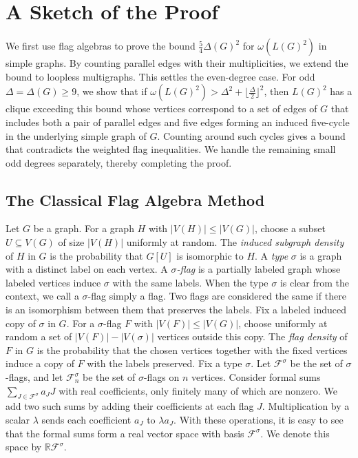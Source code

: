 \section{A Sketch of the Proof}\label{sec:overview}

We first use flag algebras to prove the bound $\frac{5}{4}\Delta(G)^2$
for $\omega(L(G)^2)$ in simple graphs. By counting parallel edges
with their multiplicities, we extend the bound to loopless multigraphs.
This settles the even-degree case.
For odd $\Delta=\Delta(G)\geq 9$, we show that if
$\omega(L(G)^2)>\Delta^2+\lfloor\frac{\Delta}{2}\rfloor^2$,
then $L(G)^2$ has a clique exceeding this bound whose vertices
correspond to a set of edges of $G$ that includes both a pair of
parallel edges and five edges forming an induced five-cycle in the
underlying simple graph of $G$. Counting around such cycles gives a
bound that contradicts the weighted flag inequalities. We handle the remaining small odd degrees separately,
thereby completing the proof.

\subsection{The Classical Flag Algebra Method}\label{subsec:flag-algebra}

Let $G$ be a graph. For a graph $H$ with $|V(H)|\leq |V(G)|$,
choose a subset $U\subseteq V(G)$ of size $|V(H)|$ uniformly at
random. The \emph{induced subgraph density} of $H$ in $G$ is the
probability that $G[U]$ is isomorphic to $H$. A \emph{type}
$\sigma$ is a graph with a distinct label on each vertex.
A \emph{$\sigma$-flag} is a partially labeled graph whose labeled
vertices induce $\sigma$ with the same labels. When the type
$\sigma$ is clear from the context, we call a $\sigma$-flag
simply a flag. Two flags are considered the same if there is an
isomorphism between them that preserves the labels. Fix a
labeled induced copy of $\sigma$ in $G$. For a $\sigma$-flag $F$
with $|V(F)|\leq |V(G)|$, choose uniformly at random a set of
$|V(F)|-|V(\sigma)|$ vertices outside this copy. The \emph{flag
density} of $F$ in $G$ is the probability that the chosen vertices
together with the fixed vertices induce a copy of $F$ with the
labels preserved. Fix a type $\sigma$. Let $\mathcal F^\sigma$
be the set of $\sigma$-flags, and let $\mathcal F^\sigma_n$ be
the set of $\sigma$-flags on $n$ vertices. Consider formal sums
$\sum_{J\in\mathcal F^\sigma}a_JJ$ with real coefficients, only
finitely many of which are nonzero. We add two such sums by
adding their coefficients at each flag $J$. Multiplication by
a scalar $\lambda$ sends each coefficient $a_J$ to $\lambda a_J$.
With these operations, it is easy to see that the formal sums
form a real vector space with basis $\mathcal F^\sigma$. We
denote this space by $\mathbb R\mathcal F^\sigma$.

